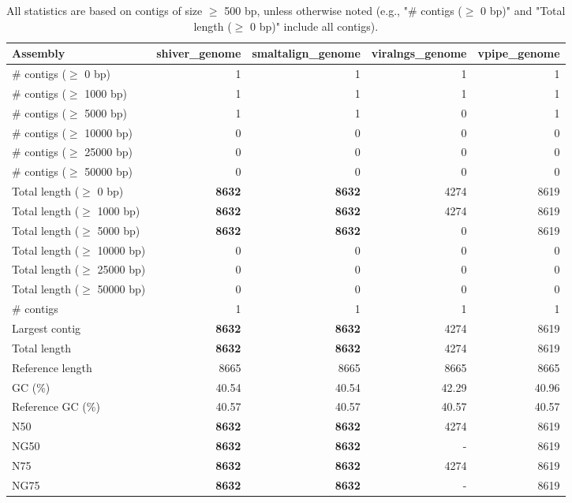\documentclass[12pt,a4paper]{article}
\begin{document}
\begin{table}[ht]
\begin{center}
\caption{All statistics are based on contigs of size $\geq$ 500 bp, unless otherwise noted (e.g., "\# contigs ($\geq$ 0 bp)" and "Total length ($\geq$ 0 bp)" include all contigs).}
\begin{tabular}{|l*{4}{|r}|}
\hline
Assembly & shiver\_genome & smaltalign\_genome & viralngs\_genome & vpipe\_genome \\ \hline
\# contigs ($\geq$ 0 bp) & 1 & 1 & 1 & 1 \\ \hline
\# contigs ($\geq$ 1000 bp) & 1 & 1 & 1 & 1 \\ \hline
\# contigs ($\geq$ 5000 bp) & 1 & 1 & 0 & 1 \\ \hline
\# contigs ($\geq$ 10000 bp) & 0 & 0 & 0 & 0 \\ \hline
\# contigs ($\geq$ 25000 bp) & 0 & 0 & 0 & 0 \\ \hline
\# contigs ($\geq$ 50000 bp) & 0 & 0 & 0 & 0 \\ \hline
Total length ($\geq$ 0 bp) & {\bf 8632} & {\bf 8632} & 4274 & 8619 \\ \hline
Total length ($\geq$ 1000 bp) & {\bf 8632} & {\bf 8632} & 4274 & 8619 \\ \hline
Total length ($\geq$ 5000 bp) & {\bf 8632} & {\bf 8632} & 0 & 8619 \\ \hline
Total length ($\geq$ 10000 bp) & 0 & 0 & 0 & 0 \\ \hline
Total length ($\geq$ 25000 bp) & 0 & 0 & 0 & 0 \\ \hline
Total length ($\geq$ 50000 bp) & 0 & 0 & 0 & 0 \\ \hline
\# contigs & 1 & 1 & 1 & 1 \\ \hline
Largest contig & {\bf 8632} & {\bf 8632} & 4274 & 8619 \\ \hline
Total length & {\bf 8632} & {\bf 8632} & 4274 & 8619 \\ \hline
Reference length & 8665 & 8665 & 8665 & 8665 \\ \hline
GC (\%) & 40.54 & 40.54 & 42.29 & 40.96 \\ \hline
Reference GC (\%) & 40.57 & 40.57 & 40.57 & 40.57 \\ \hline
N50 & {\bf 8632} & {\bf 8632} & 4274 & 8619 \\ \hline
NG50 & {\bf 8632} & {\bf 8632} & - & 8619 \\ \hline
N75 & {\bf 8632} & {\bf 8632} & 4274 & 8619 \\ \hline
NG75 & {\bf 8632} & {\bf 8632} & - & 8619 \\ \hline

\end{tabular}
\end{center}
\end{table}
\end{document}
